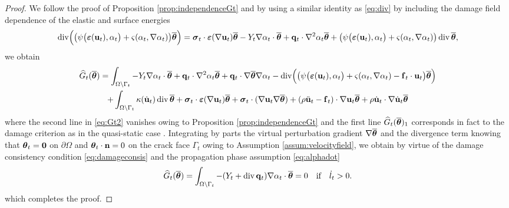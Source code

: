 \begin{proof}
We follow the proof of Proposition \ref{prop:independenceGt} and by using a similar identity as \eqref{eq:div} by including the damage field dependence of the elastic and surface energies
\begin{equation} \label{eq:includedamage}
\div\Bigl(\bigl(\psi\bigl(\eps(\vec{u}_t),\alpha_t\bigr)+\varsigma(\alpha_t,\nabla\alpha_t)\bigr)\ovtheta\Bigr)=\sig_t\cdot\eps(\nabla\vec{u}_t)\ovtheta-Y_t\nabla\alpha_t\cdot\ovtheta+\vec{q}_t\cdot\nabla^2\alpha_t\ovtheta+\bigl(\psi\bigl(\eps(\vec{u}_t),\alpha_t\bigr)+\varsigma(\alpha_t,\nabla\alpha_t)\bigr)\div\ovtheta,
\end{equation}
we obtain
\begin{multline} \label{eq:Gt2}
\widehat{G}_t(\ovtheta)=\int_\domaint -Y_t\nabla\alpha_t\cdot\ovtheta +\vec{q}_t\cdot\nabla^2\alpha_t\ovtheta+\vec{q}_t\cdot\nabla\ovtheta\nabla\alpha_t-\div\Bigl(\bigl(\psi\bigl(\eps(\vec{u}_t),\alpha_t\bigr)+\varsigma(\alpha_t,\nabla\alpha_t)-\vec{f}_t\cdot\vec{u}_t\bigr)\ovtheta\Bigr) \\
+\int_\domaint\kappa(\dot{\vec{u}}_t)\div\ovtheta+\sig_t\cdot\eps(\nabla\vec{u}_t)\ovtheta+\sig_t\cdot(\nabla\vec{u}_t\nabla\ovtheta)+(\rho\ddot{\vec{u}}_t-\vec{f}_t)\cdot\nabla\vec{u}_t\ovtheta+\rho\dot{\vec{u}}_t\cdot\nabla\dot{\vec{u}}_t\ovtheta
\end{multline}
where the second line in \eqref{eq:Gt2} vanishes owing to Proposition \ref{prop:independenceGt} and the first line $\widehat{G}_t(\ovtheta)_1$ corresponds in fact to the damage criterion as in the quasi-static case \cite{SicsicMarigo:2013}. Integrating by parts the virtual perturbation gradient $\nabla\ovtheta$ and the divergence term knowing that $\vtheta_t=\vec{0}$ on $\partial\Omega$ and $\vtheta_t\cdot\vec{n}=0$ on the crack face $\Gamma_t$ owing to Assumption \ref{assum:velocityfield}, we obtain by virtue of the damage consistency condition \eqref{eq:damageconsis} and the propagation phase assumption \eqref{eq:alphadot}
\[
\widehat{G}_t(\ovtheta)=\int_\domaint -(Y_t+\div\vec{q}_t)\nabla\alpha_t\cdot\ovtheta=0\quad\text{if}\quad\dot{l}_t>0.
\]
which completes the proof.
\end{proof}

